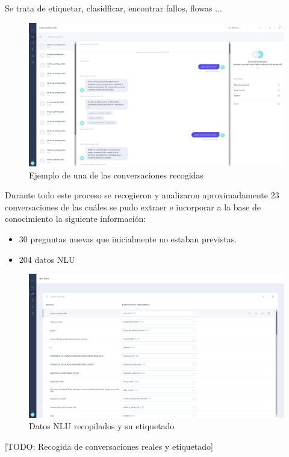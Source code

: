 Se trata de etiquetar, clasidficar, encontrar fallos, flowas ...\\	

\begin{figure}[htbp]
\centering
\includegraphics[scale=0.3]{../images/collected_dialogs.png} 
\caption{Ejemplo de una de las conversaciones recogidas}
\label{fig:collected dialogs}
\end{figure}

Durante todo este proceso se recogieron y analizaron aproximadamente 23 conversaciones de las cuáles se pudo extraer e incorporar a la base de conocimiento la siguiente información:\\

\begin{itemize}
	\item 30 preguntas nuevas que inicialmente no estaban previstas.
	\item 204 datos NLU
\end{itemize}


\begin{figure}[htbp]
\centering
\includegraphics[scale=0.3]{../images/collected_nlu.png} 
\caption{Datos NLU recopilados y su etiquetado}
\label{fig:collected nlu}
\end{figure}




[TODO: Recogida de conversaciones reales y etiquetado]
